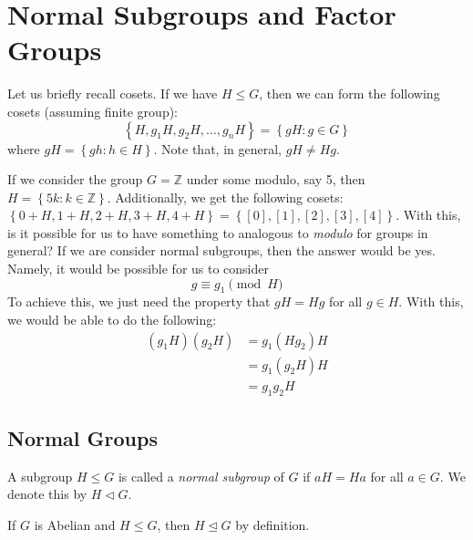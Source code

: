 \chapter{Normal Subgroups and Factor Groups}

Let us briefly recall cosets. If we have \(H \leq G\), then we can form the following cosets (assuming finite group):
\[
    \left\{H, g_1H, g_2H, ..., g_nH\right\} = \left\{gH : g \in G\right\}
\]
where \(gH = \left\{gh : h \in H\right\}\). Note that, in general, \(gH \neq Hg\).

If we consider the group \(G = \mathbb{Z}\) under some modulo, say 5, then \(H = \left\{5k : k \in \mathbb{Z}\right\}\). Additionally, we get the following cosets: \(\left\{0+H, 1+H, 2+H, 3+H, 4+H\right\} = \left\{[0], [1], [2], [3], [4]\right\}\). With this, is it possible for us to have something to analogous to \textit{modulo} for groups in general? If we are consider normal subgroups, then the answer would be yes. Namely, it would be possible for us to consider
\[
    g \equiv g_1 \pmod H
\]
To achieve this, we just need the property that \(gH = Hg\) for all \(g \in H\). With this, we would be able to do the following:
\[
\begin{aligned}
    (g_1H)(g_2H) &= g_1(Hg_2)H \\
                 &= g_1(g_2H)H \\
                 &= g_1 g_2 H
\end{aligned}
\]

\section{Normal Groups}

\begin{definition}
    A subgroup \(H \leq G\) is called a \textit{normal subgroup} of \(G\) if \(aH = Ha\) for all \(a \in G\). We denote this by \(H \triangleleft G\).
\end{definition}

\begin{nexample}
    If \(G\) is Abelian and \(H \leq G\), then \(H \unlhd G\) by definition.
\end{nexample}

